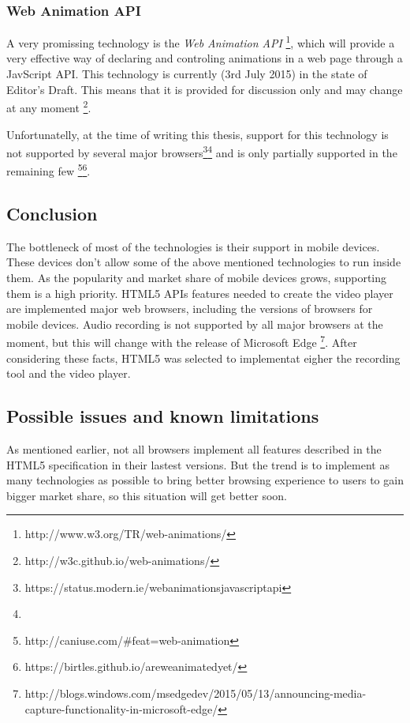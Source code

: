 \subsubsection*{Web Animation API}
A very promissing technology is the \textit{Web Animation API} \footnote{http://www.w3.org/TR/web-animations/}, which will provide a very effective way of declaring and controling animations in a web page through a JavScript API. This technology is currently (3rd July 2015) in the state of Editor's Draft. This means that it is provided for discussion only and may change at any moment \cite{} \footnote{http://w3c.github.io/web-animations/}.

Unfortunatelly, at the time of writing this thesis, support for this technology is not supported by several major browsers\footnote{https://status.modern.ie/webanimationsjavascriptapi}\footnote{} and is only partially supported in the remaining few \footnote{http://caniuse.com/\#feat=web-animation}\footnote{https://birtles.github.io/areweanimatedyet/}.

\subsection{Conclusion}
The bottleneck of most of the technologies is their support in mobile devices. These devices don't allow some of the above mentioned technologies to run inside them. As the popularity and market share of mobile devices grows, supporting them is a high priority. HTML5 APIs features needed to create the video player are implemented major web browsers, including the versions of browsers for mobile devices. Audio recording is not supported by all major browsers at the moment, but this will change with the release of Microsoft Edge \cite{}\footnote{http://blogs.windows.com/msedgedev/2015/05/13/announcing-media-capture-functionality-in-microsoft-edge/}. After considering these facts, HTML5 was selected to implementat eigher the recording tool and the video player.

\subsection{Possible issues and known limitations}
As mentioned earlier, not all browsers implement all features described in the HTML5 specification in their lastest versions. But the trend is to implement as many technologies as possible to bring better browsing experience to users to gain bigger market share, so this situation will get better soon.

